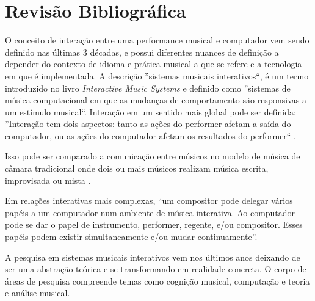 \documentclass{ppgmus}
\begin{document}


\chapter{Revisão Bibliográfica}
\label{sec:rev}

O conceito de interação entre uma performance musical e computador vem
sendo definido nas últimas 3 décadas, e possui diferentes nuances de definição
a depender do contexto de idioma e prática musical a que se refere e a tecnologia
em que é implementada. A descrição ''sistemas musicais interativos``, é um
termo introduzido no livro \textit{Interactive Music Systems} 
\cite{rowe93:interactive} e definido como ''sistemas de música 
computacional em que as mudanças de comportamento são responsivas a um
estímulo musical``. Interação em um sentido mais global pode ser definida: 
  ''Interação tem dois aspectos:
tanto as ações do performer afetam a saída do computador, ou as ações do computador
afetam os resultados do performer`` \cite{garnett:2001}.

Isso pode ser comparado a comunicação entre músicos no modelo de  música de 
câmara tradicional onde dois ou mais músicos realizam música escrita, improvisada 
ou mista \cite{winkler93:interactive}.

Em relações interativas mais complexas, ``um compositor pode
delegar vários papéis a um computador num ambiente de música interativa. Ao
computador pode se dar o papel de instrumento, performer, regente, e/ou compositor.
Esses papéis podem existir  simultaneamente e/ou mudar continuamente''\cite{lippe:2002}.



A pesquisa em sistemas musicais interativos vem nos últimos anos
deixando de ser uma abstração teórica e se transformando em realidade
concreta. O corpo de áreas de pesquisa compreende temas como cognição
musical, computação e teoria e análise musical.
\end{document}
